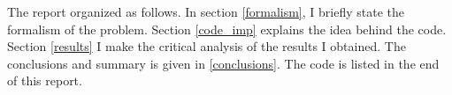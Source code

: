 The report organized as follows. In section \ref{formalism}, I briefly state the formalism of the problem. Section \ref{code_imp} explains the idea behind the code. Section \ref{results} I make the critical analysis of the results I obtained. The conclusions and summary is given in \ref{conclusions}. The code is listed in the end of this report.